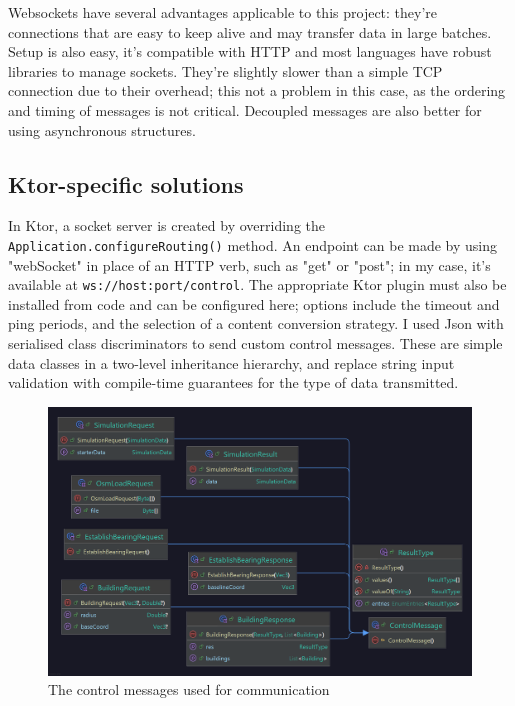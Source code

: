 Websockets have several advantages applicable to this project: they're connections that are easy to keep alive and may transfer data in large batches. Setup is also easy, it's compatible with HTTP and most languages have robust libraries to manage sockets. They're slightly slower than a simple TCP connection due to their overhead; this not a problem in this case, as the ordering and timing of messages is not critical. Decoupled messages are also better for using asynchronous structures.

\subsection{Ktor-specific solutions}

In Ktor, a socket server is created by overriding the \verb|Application.configureRouting()| method. An endpoint can be made by using "webSocket" in place of an HTTP verb, such as "get" or "post"; in my case, it's available at \verb|ws://host:port/control|. The appropriate Ktor plugin must also be installed from code and can be configured here; options include the timeout and ping periods, and the selection of a content conversion strategy. I used Json with serialised class discriminators to send custom control messages. These are simple data classes in a two-level inheritance hierarchy, and replace string input validation with compile-time guarantees for the type of data transmitted.

\label{control-msg}
\begin{figure}[!ht]
    \centering
    \includegraphics[width=140mm, keepaspectratio]{images/control-messages.png}
    \caption{The control messages used for communication}
\end{figure}

